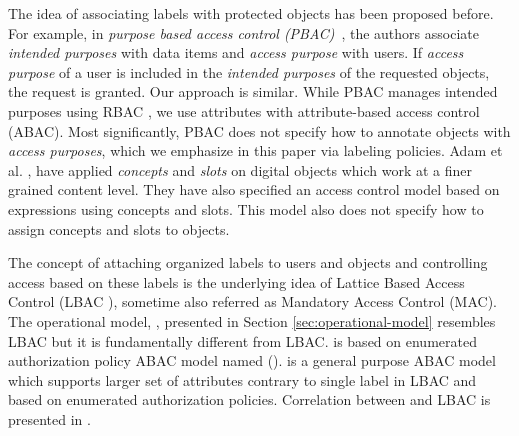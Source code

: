 
The idea of associating labels with protected objects has been proposed before. For example,  in \textit{purpose based access control (PBAC)}~\cite{purpose-bac}, the authors associate \textit{intended purposes} with data items and \textit{access purpose} with users. If \textit{access purpose} of a user is included in the \textit{intended purposes} of the requested objects, the request is granted. Our approach is similar. While PBAC manages intended purposes using RBAC \cite{rbac}, we use attributes with attribute-based access control (ABAC). Most significantly, PBAC does not specify how to annotate objects with \textit{access purposes}, which we emphasize in this paper via labeling policies. Adam et al. \cite{content-bac}, have applied \textit{concepts} and \emph{slots} on digital objects which work at a finer grained content level. They have also   specified an access control model based on expressions using concepts and slots.  This model also does not specify how to assign concepts and slots to objects. 

The concept of attaching organized labels to users and objects and controlling access based on these labels is the underlying idea of Lattice Based Access Control (LBAC \cite{lbac}), sometime also referred as Mandatory Access Control (MAC). The operational model, \atom{}, presented in Section \ref{sec:operational-model} resembles LBAC but it is fundamentally different from LBAC. \atom{} is based on enumerated authorization policy ABAC model named \eapabac{} (\cite{labac,eap-abac}). \eapabac{} is a general purpose ABAC model which supports larger set of attributes contrary to single label in LBAC and based on enumerated authorization policies. Correlation between \eapabac{} and LBAC is presented in \cite{labac}.



